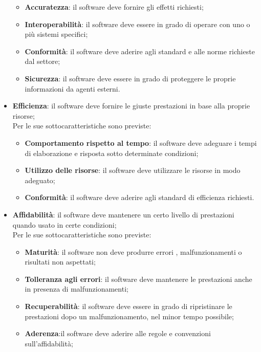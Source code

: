 \documentclass[../piano-di-qualifica.tex]{subfiles}
\begin{document}
\begin{itemize}
\begin{itemize}
            \item \textbf{Accuratezza}: il software deve fornire gli effetti richiesti;
            \item \textbf{Interoperabilità}: il software deve essere in grado di operare con uno o più sistemi specifici;
            \item \textbf{Conformità}: il software deve aderire agli standard e alle norme richieste dal settore;
            \item \textbf{Sicurezza}: il software deve essere in grado di proteggere le proprie informazioni da agenti esterni.
        \end{itemize}
        \item \textbf{Efficienza}: il software deve fornire le giuste prestazioni in base alla proprie risorse;
        \\Per le sue sottocaratteristiche sono previste:
        \begin{itemize}
            \item \textbf{Comportamento rispetto al tempo}: il software deve adeguare i tempi di elaborazione e risposta sotto determinate condizioni;
            \item \textbf{Utilizzo delle risorse}: il software deve utilizzare le risorse in modo adeguato;
            \item \textbf{Conformità}: il software deve aderire agli standard di efficienza richiesti.
        \end{itemize}
        \item \textbf{Affidabilità}: il software deve mantenere un certo livello di prestazioni quando usato in certe condizioni;
        \\Per le sue sottocaratteristiche sono previste:
        \begin{itemize}
            \item \textbf{Maturità}: il software non deve produrre errori , malfunzionamenti o risultati non aspettati;
            \item \textbf{Tolleranza agli errori}: il software deve mantenere le prestazioni anche in presenza di malfunzionamenti;
            \item \textbf{Recuperabilità}: il software deve essere in grado di ripristinare le prestazioni dopo un malfunzionamento, nel minor tempo possibile;
            \item \textbf{Aderenza}:il software deve aderire alle regole e convenzioni sull'affidabilità;
        \end{itemize}

\end{itemize}
\end{document}
